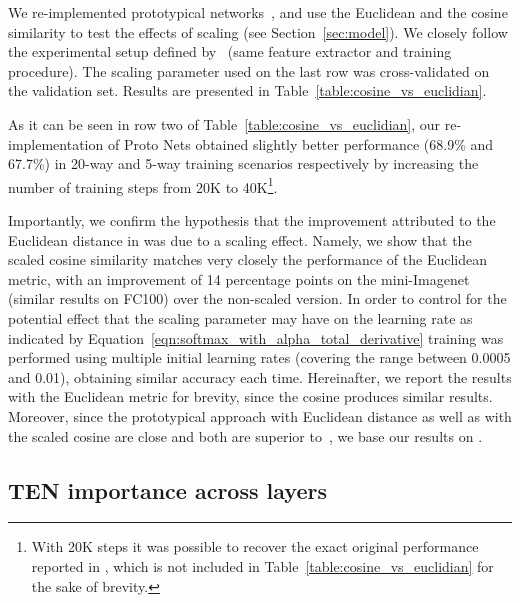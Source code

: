 \documentclass{article}
\begin{document}
We re-implemented prototypical networks~\citep{snell2017prototypical}, and use the Euclidean and the cosine similarity to test the effects of scaling (see Section~\ref{sec:model}). We closely follow the experimental setup defined by~\citet{snell2017prototypical} (same feature extractor and training procedure). The scaling parameter  used on the last row was cross-validated on the validation set. Results are presented in Table~\ref{table:cosine_vs_euclidian}.

As it can be seen in row two of Table~\ref{table:cosine_vs_euclidian}, our re-implementation of Proto Nets \citep{snell2017prototypical} obtained slightly better performance (68.9\% and 67.7\%) in 20-way and 5-way training scenarios respectively by increasing the number of training steps from 20K to 40K\footnote{With 20K steps it was possible to recover the exact original performance reported in \citet{snell2017prototypical}, which is not included in Table~\ref{table:cosine_vs_euclidian} for the sake of brevity.}.

Importantly, we confirm the hypothesis that the improvement attributed to the Euclidean distance in \cite{snell2017prototypical} was due to a scaling effect. Namely, we show that the scaled cosine similarity matches very closely the performance of the Euclidean metric, with an improvement of 14 percentage points on the mini-Imagenet (similar results on FC100) over the non-scaled version. In order to control for the potential effect that the scaling parameter  may have on the learning rate as indicated by Equation~\eqref{eqn:softmax_with_alpha_total_derivative} training was performed using multiple initial learning rates (covering the range between 0.0005 and 0.01), obtaining similar accuracy each time.  Hereinafter, we report the results with the Euclidean metric for brevity, since the cosine produces similar results. Moreover, since the prototypical approach with Euclidean distance as well as with the scaled cosine are close and both are superior to~\cite{vinyals2016matching}, we base our results on \cite{snell2017prototypical}.




\subsection{TEN importance across layers} \label{ssec:tbn_importance_vs_depth}
\end{document}
